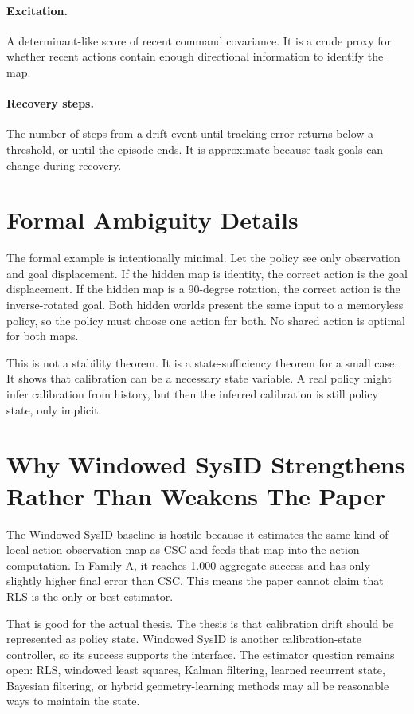 \documentclass{article}
\begin{document}
\paragraph{Excitation.}
A determinant-like score of recent command covariance. It is a crude proxy for
whether recent actions contain enough directional information to identify the
map.

\paragraph{Recovery steps.}
The number of steps from a drift event until tracking error returns below a
threshold, or until the episode ends. It is approximate because task goals can
change during recovery.

\section{Formal Ambiguity Details}

The formal example is intentionally minimal. Let the policy see only
observation and goal displacement. If the hidden map is identity, the correct
action is the goal displacement. If the hidden map is a 90-degree rotation, the
correct action is the inverse-rotated goal. Both hidden worlds present the same
input to a memoryless policy, so the policy must choose one action for both.
No shared action is optimal for both maps.

This is not a stability theorem. It is a state-sufficiency theorem for a small
case. It shows that calibration can be a necessary state variable. A real
policy might infer calibration from history, but then the inferred calibration
is still policy state, only implicit.

\section{Why Windowed SysID Strengthens Rather Than Weakens The Paper}

The Windowed SysID baseline is hostile because it estimates the same kind of
local action-observation map as CSC and feeds that map into the action
computation. In Family A, it reaches 1.000 aggregate success and has only
slightly higher final error than CSC. This means the paper cannot claim that
RLS is the only or best estimator.

That is good for the actual thesis. The thesis is that calibration drift should
be represented as policy state. Windowed SysID is another calibration-state
controller, so its success supports the interface. The estimator question
remains open: RLS, windowed least squares, Kalman filtering, learned recurrent
state, Bayesian filtering, or hybrid geometry-learning methods may all be
reasonable ways to maintain the state.
\end{document}
